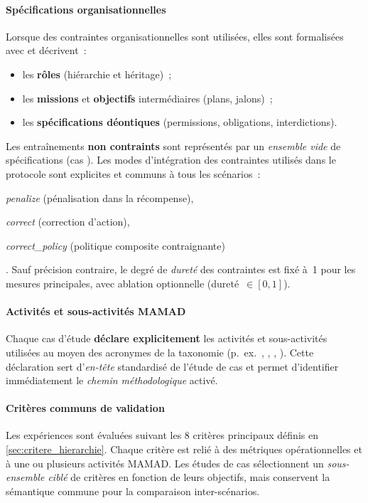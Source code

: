 \paragraph{Spécifications organisationnelles}
Lorsque des contraintes organisationnelles sont utilisées, elles sont formalisées avec  et décrivent~:
\begin{itemize}
  \item les \textbf{rôles} (hiérarchie et héritage)~;
  \item les \textbf{missions} et \textbf{objectifs} intermédiaires (plans, jalons)~;
  \item les \textbf{spécifications déontiques} (permissions, obligations, interdictions).
\end{itemize}
Les entraînements \textbf{non contraints} sont représentés par un \textit{ensemble vide} de spécifications (cas ). Les modes d’intégration des contraintes utilisés dans le protocole sont explicites et communs à tous les scénarios~:
\begin{enumerate*}[label=\roman*)]
  \item \textit{penalize} (pénalisation dans la récompense),
  \item \textit{correct} (correction d’action),
  \item \textit{correct\_policy} (politique composite contraignante)
\end{enumerate*}.
Sauf précision contraire, le degré de \textit{dureté} des contraintes est fixé à~1 pour les mesures principales, avec ablation optionnelle (dureté~$\in[0,1]$).

\paragraph{Activités et sous-activités MAMAD}
Chaque cas d’étude \textbf{déclare explicitement} les activités et sous-activités utilisées au moyen des acronymes de la taxonomie (p.~ex.~, , , ). Cette déclaration sert d’\textit{en-tête} standardisé de l’étude de cas et permet d’identifier immédiatement le \textit{chemin méthodologique} activé.

\paragraph{Critères communs de validation}
Les expériences sont évaluées suivant les 8 critères principaux définis en \autoref{sec:critere_hierarchie}. Chaque critère est relié à des métriques opérationnelles et à une ou plusieurs activités MAMAD. Les études de cas sélectionnent un \textit{sous-ensemble ciblé} de critères en fonction de leurs objectifs, mais conservent la sémantique commune pour la comparaison inter-scénarios.

